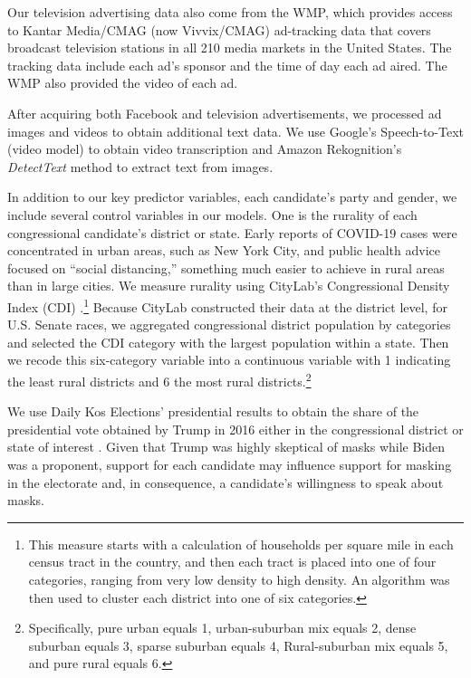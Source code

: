 Our television advertising data also come from the WMP, which provides access to Kantar Media/CMAG (now Vivvix/CMAG) ad-tracking data that covers broadcast television stations in all 210 media markets in the United States. The tracking data include each ad's sponsor and the time of day each ad aired. The WMP also provided the video of each ad.

After acquiring both Facebook and television advertisements, we processed ad images and videos to obtain additional text data. We use Google's Speech-to-Text (video model) to obtain video transcription and Amazon Rekognition's \textit{DetectText} method to extract text from images.

In addition to our key predictor variables, each candidate's party and gender, we include several control variables in our models.  One is the rurality of each congressional candidate's district or state. Early reports of COVID-19 cases were concentrated in urban areas, such as New York City, and public health advice focused on ``social distancing,'' something much easier to achieve in rural areas than in large cities.  We measure rurality using CityLab's Congressional Density Index (CDI) \parencite{montgomery2020}.\footnote{This measure starts with a calculation of households per square mile in each census tract in the country, and then each tract is placed into one of four categories, ranging from very low density to high density. An algorithm was then used to cluster each district into one of six categories.}  Because CityLab constructed their data at the district level, for U.S. Senate races, we aggregated congressional district population \parencite{us2020american} by categories and selected the CDI category with the largest population within a state. Then we recode this six-category variable into a continuous variable with 1 indicating the least rural districts and 6 the most rural districts.\footnote{Specifically, pure urban equals 1, urban-suburban mix equals 2, dense suburban equals 3, sparse suburban equals 4, Rural-suburban mix equals 5, and pure rural equals 6.}

We use Daily Kos Elections' presidential results to obtain the share of the presidential vote obtained by Trump in 2016 either in the congressional district or state of interest \parencite{dailykos2016}.  Given that Trump was highly skeptical of masks while Biden was a proponent, support for each candidate may influence support for masking in the electorate and, in consequence, a candidate's willingness to speak about masks.

